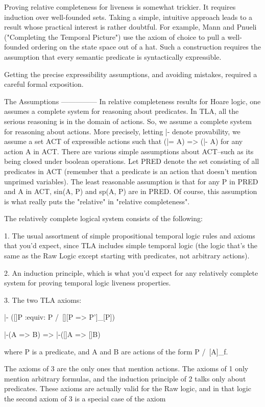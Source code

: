 \begin{spec}
Proving relative completeness for liveness is somewhat trickier.
It requires induction over well-founded sets.  Taking a simple,
intuitive approach leads to a result whose practical interest is
rather doubtful.  For example, Mann and Pnueli ("Completing the
Temporal Picture") use the axiom of choice to pull a well-founded
ordering on the state space out of a hat.  Such a construction
requires the assumption that every semantic predicate is
syntactically expressible.  

Getting the precise expressibility assumptions, and avoiding
mistakes, required a careful formal exposition.


The Assumptions
---------------
In relative completeness results for Hoare logic, one assumes a
complete system for reasoning about predicates.  In TLA, all the
serious reasoning is in the domain of actions.  So, we assume a
complete system for reasoning about actions.  More precisely,
letting |- denote provability, we assume a set ACT of expressible
actions such that (|= A) => (|- A) for any action A in ACT. There
are various simple assumptions about ACT--such as its being closed
under boolean operations.  Let PRED denote the set consisting of
all predicates in ACT (remember that a predicate is an action that
doesn't mention unprimed variables).  The least reasonable
assumption is that for any P in PRED and A in ACT, sin(A, P) and
sp(A, P) are in PRED. Of course, this assumption is what really
puts the "relative" in "relative completeness".

The relatively complete logical system consists of the following:

1. The usual assortment of simple propositional temporal logic
   rules and axioms that you'd expect, since TLA includes
   simple temporal logic (the logic that's the same as the Raw
   Logic except starting with predicates, not arbitrary actions).

2. An induction principle, which is what you'd expect for any
   relatively complete system for proving temporal logic
   liveness properties.

3. The two TLA axioms:

      |- ([]P :equiv: P /\ [][P => P']_[P])

      |-(A => B)  =>  |-([]A => []B)

   where P is a predicate, and A and B are actions of the form 
   P /\ [A]_f.

The axioms of 3 are the only ones that mention actions.  The axioms
of 1 only mention arbitrary formulas, and the induction principle
of 2 talks only about predicates.  These axioms are actually valid
for the Raw logic, and in that logic the second axiom of 3
is a special case of the axiom


\end{spec}
